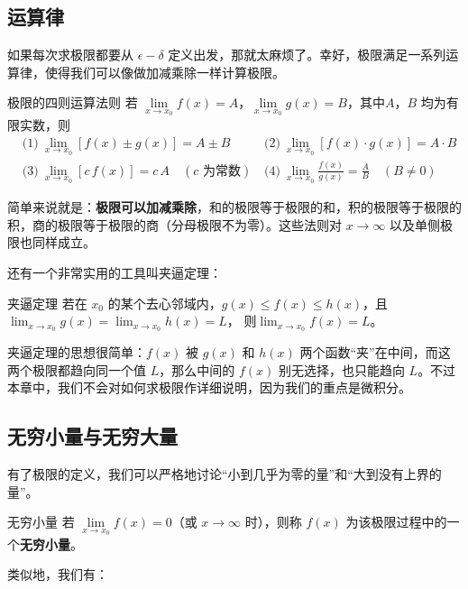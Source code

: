 \subsection{运算律}

如果每次求极限都要从 $\epsilon-\delta$ 定义出发，那就太麻烦了。幸好，极限满足一系列运算律，使得我们可以像做加减乘除一样计算极限。

\begin{theorem}{极限的四则运算法则}{}
若 $\lim\limits_{x \to x_0} f(x) = A$，$\lim\limits_{x \to x_0} g(x) = B$，其中$A$，$B$ 均为有限实数，则
\[
\begin{aligned}
&\text{(1)}\ \lim_{x \to x_0} [f(x) \pm g(x)] = A \pm B
&&\text{(2)}\ \lim_{x \to x_0} [f(x) \cdot g(x)] = A \cdot B \\[4pt]
&\text{(3)}\ \lim_{x \to x_0} [c\,f(x)] = c\,A \quad (c\text{ 为常数})
&&\text{(4)}\ \lim_{x \to x_0} \frac{f(x)}{g(x)} = \frac{A}{B} \quad (B \neq 0)
\end{aligned}
\]
\end{theorem}

简单来说就是：\textbf{极限可以加减乘除}，和的极限等于极限的和，积的极限等于极限的积，商的极限等于极限的商（分母极限不为零）。这些法则对 $x \to \infty$ 以及单侧极限也同样成立。

还有一个非常实用的工具叫夹逼定理：

\begin{theorem}{夹逼定理}{}
若在 $x_0$ 的某个去心邻域内，$g(x) \leq f(x) \leq h(x)$，且
\(\lim_{x \to x_0} g(x) = \lim_{x \to x_0} h(x) = L\)，
则\(\lim_{x \to x_0} f(x) = L\)。
\end{theorem}

夹逼定理的思想很简单：$f(x)$ 被 $g(x)$ 和 $h(x)$ 两个函数“夹”在中间，而这两个极限都趋向同一个值 $L$，那么中间的 $f(x)$ 别无选择，也只能趋向 $L$。不过本章中，我们不会对如何求极限作详细说明，因为我们的重点是微积分。

\subsection{无穷小量与无穷大量}

有了极限的定义，我们可以严格地讨论“小到几乎为零的量”和“大到没有上界的量”。

\begin{definition}{无穷小量}{}
若 $\lim\limits_{x \to x_0} f(x) = 0$（或 $x \to \infty$ 时），则称 $f(x)$ 为该极限过程中的一个\textbf{无穷小量}。
\end{definition}

类似地，我们有：

